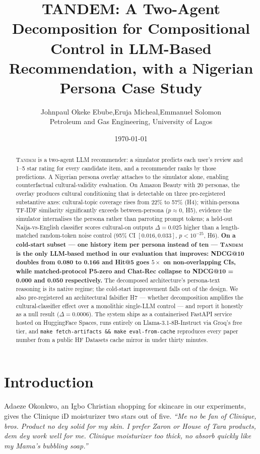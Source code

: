 \documentclass[8pt,twocolumn,a4paper]{extarticle}
\title{TANDEM: A Two-Agent Decomposition for Compositional Control in LLM-Based Recommendation, with a Nigerian Persona Case Study}
\author{%
  Johnpaul Okeke Ebube,\quad Eruja Micheal,\quad Emmanuel Solomon\\[2pt]
  {\small Petroleum and Gas Engineering, University of Lagos}
}
\date{\today}
\begin{document}
\maketitle

\begin{abstract}
\textsc{Tandem} is a two-agent LLM recommender: a simulator predicts each user's review and 1--5 star rating for every candidate item, and a recommender ranks by those predictions. A Nigerian persona overlay attaches to the simulator alone, enabling counterfactual cultural-validity evaluation. On Amazon Beauty with 20 personas, the overlay produces cultural conditioning that is detectable on three pre-registered substantive axes: cultural-topic coverage rises from 22\% to 57\% (H4); within-persona TF-IDF similarity significantly exceeds between-persona ($p \approx 0$, H5), evidence the simulator internalises the persona rather than parroting prompt tokens; a held-out Naija-vs-English classifier scores cultural-on outputs $\Delta = 0.025$ higher than a length-matched random-token noise control (95\% CI $[0.016, 0.033]$, $p < 10^{-25}$, H6). \textbf{On a cold-start subset --- one history item per persona instead of ten --- \textsc{Tandem} is the only LLM-based method in our evaluation that improves: NDCG@10 doubles from 0.080 to 0.166 and Hit@5 goes $5\times$ on non-overlapping CIs, while matched-protocol P5-zero and Chat-Rec collapse to NDCG@10 = 0.000 and 0.050 respectively.} The decomposed architecture's persona-text reasoning is its native regime; the cold-start improvement falls out of the design. We also pre-registered an architectural falsifier H7 --- whether decomposition amplifies the cultural-classifier effect over a monolithic single-LLM control --- and report it honestly as a null result ($\Delta = 0.0006$). The system ships as a containerised FastAPI service hosted on HuggingFace Spaces, runs entirely on Llama-3.1-8B-Instruct via Groq's free tier, and \texttt{make fetch-artifacts \&\& make eval-from-cache} reproduces every paper number from a public HF Datasets cache mirror in under thirty minutes.
\end{abstract}

\section{Introduction}
\label{sec:intro}

Adaeze Okonkwo, an Igbo Christian shopping for skincare in our experiments, gives the Clinique iD moisturizer two stars out of five. \emph{``Me no be fan of Clinique, bros. Product no dey solid for my skin. I prefer Zaron or House of Tara products, dem dey work well for me. Clinique moisturizer too thick, no absorb quickly like my Mama's bubbling soap.''}
\end{document}
